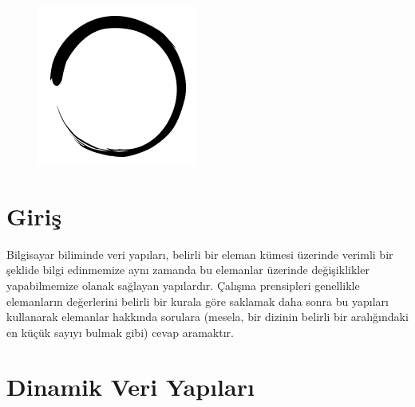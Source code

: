 \documentclass[12pt]{article}
\title{\vspace{-2em}\mytitle\vspace{-0.3em}}
\author{
	\textbf{Editor}\\
	Tahsin Enes Kuru  \\ \ \\ 
	\textbf{Reviewers} \\ 
	Baha Eren Yald{\i}z \\
    Burak Bu\u{g}rul \\ \ \\
	\textbf{Contributor} \\ 
	Kerim Kochekov \\
}
\date{}
\begin{document}
	
	\begin{figure}
		\centering
		\includegraphics[width=\linewidth/4]{inzva-logo.png}
		\label{fig:inzva}
	\end{figure}
	\maketitle
	
	\cleardoublepage
	\tableofcontents
	\cleardoublepage
	
	\section{Giri\c{s}} \label{introduction}

    Bilgisayar biliminde veri yap{\i}lar{\i}, belirli bir eleman k\"{u}mesi \"{u}zerinde verimli bir \c{s}eklide bilgi edinmemize ayn{\i} zamanda bu elemanlar \"{u}zerinde de\u{g}i\c{s}iklikler yapabilmemize olanak sa\u{g}layan yap{\i}lard{\i}r. \c{C}al{\i}\c{s}ma prensipleri genellikle elemanlar{\i}n de\u{g}erlerini belirli bir kurala g\"{o}re saklamak daha sonra bu yap{\i}lar{\i} kullanarak elemanlar hakk{\i}nda sorulara (mesela, bir dizinin belirli bir aral{\i}\u{g}{\i}ndaki en k\"{u}\c{c}\"{u}k say{\i}y{\i} bulmak gibi) cevap aramakt{\i}r.
	\section{Dinamik Veri Yap{\i}lar{\i}} \label{dynamic}
\end{document}
